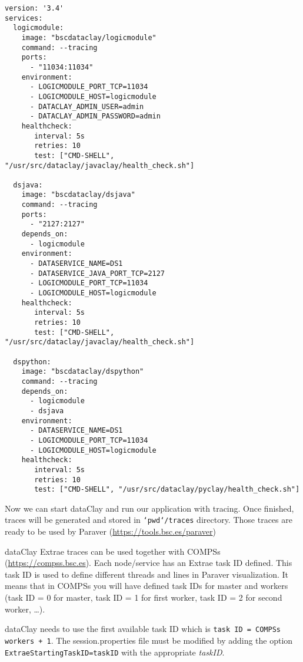 \begin{tBox}
 \begin{lstlisting}[language=docker-compose-2, frame=none]
version: '3.4'
services:
  logicmodule:
    image: "bscdataclay/logicmodule"
    command: --tracing
    ports:
      - "11034:11034"
    environment:
      - LOGICMODULE_PORT_TCP=11034
      - LOGICMODULE_HOST=logicmodule
      - DATACLAY_ADMIN_USER=admin
      - DATACLAY_ADMIN_PASSWORD=admin
    healthcheck:
       interval: 5s
       retries: 10
       test: ["CMD-SHELL", "/usr/src/dataclay/javaclay/health_check.sh"]
         
  dsjava:
    image: "bscdataclay/dsjava"
    command: --tracing
    ports:
      - "2127:2127"
    depends_on:
      - logicmodule
    environment:
      - DATASERVICE_NAME=DS1
      - DATASERVICE_JAVA_PORT_TCP=2127
      - LOGICMODULE_PORT_TCP=11034
      - LOGICMODULE_HOST=logicmodule
    healthcheck:
       interval: 5s
       retries: 10
       test: ["CMD-SHELL", "/usr/src/dataclay/javaclay/health_check.sh"]
       
  dspython:
    image: "bscdataclay/dspython"
    command: --tracing
    depends_on:
      - logicmodule
      - dsjava
    environment:
      - DATASERVICE_NAME=DS1
      - LOGICMODULE_PORT_TCP=11034
      - LOGICMODULE_HOST=logicmodule
    healthcheck:
       interval: 5s
       retries: 10
       test: ["CMD-SHELL", "/usr/src/dataclay/pyclay/health_check.sh"]
 \end{lstlisting}
\end{tBox}

Now we can start dataClay and run our application with tracing. Once finished, traces will be generated and stored in \texttt{`pwd`/traces} directory. 
Those traces are ready to be used by Paraver (\href {https://tools.bsc.es/paraver} {https://tools.bsc.es/paraver})

dataClay Extrae traces can be used together with COMPSs (\href {https://compss.bsc.es} {https://compss.bsc.es}). Each node/service has an Extrae task ID defined. This task ID is used to define different threads and lines in Paraver visualization. It means that in COMPSs you will have defined task IDs for master and workers (task ID = 0 for master, task ID = 1 for first worker, task ID = 2 for second worker, \ldots).

dataClay needs to use the first available task ID which is \texttt{task ID = COMPSs workers + 1}. The session.properties file must be modified by adding the option \texttt{ExtraeStartingTaskID=taskID} with the appropriate \textit{taskID}.

